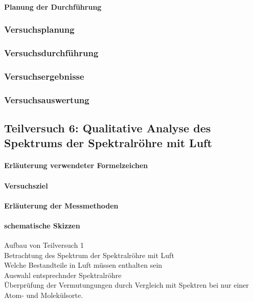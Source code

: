 \documentclass[12pt,oneside,oldfontcommands]{memoir}
\begin{document}
\paragraph{Planung der Durchführung}
\subsubsection{Versuchsplanung}
\subsubsection{Versuchsdurchführung}
\subsubsection{Versuchsergebnisse}
\subsubsection{Versuchsauswertung}

\subsection{Teilversuch 6: Qualitative Analyse des Spektrums der Spektralröhre mit Luft}
\paragraph{Erläuterung verwendeter Formelzeichen}
\paragraph{Versuchsziel}
\paragraph{Erläuterung der Messmethoden}
\paragraph{schematische Skizzen}

Aufbau von Teilversuch 1\\

Betrachtung des Spektrum der Spektralröhre mit Luft\\

Welche Bestandteile in Luft müssen enthalten sein\\

Auswahl entsprechnder Spektralröhre\\

Überprüfung der Vermutungungen durch Vergleich mit Spektren bei nur einer Atom- und Molekülsorte.\\
\end{document}
